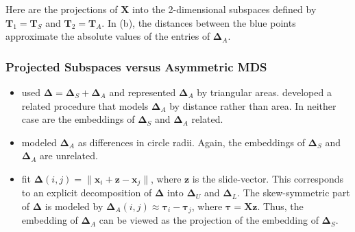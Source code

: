 \documentclass[professionalfonts,hyperref={pdfpagelabels=false,colorlinks=true,linkcolor=cyan}]{beamer}
\begin{document}
\begin{frame}
  \label{morsecode:fig}
  Here are the projections of $\mathbf{X}$ into the 2-dimensional
  subspaces defined by $\mathbf{T}_1 = \mathbf{T}_S$ and $\mathbf{T}_2
  = \mathbf{T}_A$. In (b), the distances between the blue points
  approximate the absolute values of the entries of $\bm{\Delta}_A$. 
\begin{figure}[htbp]
  \centering
  \label{fig:morsecode}
\end{figure}
\end{frame}


\begin{frame}
  \frametitle{Projected Subspaces versus Asymmetric MDS}
  \begin{itemize}
  \item \cite{gower77:_recen} used $\bm{\Delta} = \bm{\Delta}_S +
    \bm{\Delta}_A$ and represented $\bm{\Delta}_A$ by triangular
    areas. \cite{borg05:_moder} developed a related procedure that
    models $\bm{\Delta}_A$ by distance rather than area. In neither
    case are the embeddings of $\bm{\Delta}_S$ and $\bm{\Delta}_A$
    related. \vskip10pt
  \item \cite{okada87:_geomet} modeled $\bm{\Delta}_A$ as differences
    in circle radii. Again, the embeddings of $\bm{\Delta}_S$ and
    $\bm{\Delta}_A$ are unrelated. \vskip10pt 
  \item \cite{zielmand93:_analy} fit $\bm{\Delta}(i,j) =
    \|\mathbf{x}_i + \mathbf{z} - \mathbf{x}_j\|$, where $\mathbf{z}$
    is the slide-vector. This corresponds to an explicit decomposition
    of $\bm{\Delta}$ into $\bm{\Delta}_U$ and $\bm{\Delta}_L$. The
    skew-symmetric part of $\bm{\Delta}$ is modeled by
    $\bm{\Delta}_A(i,j) \approx \bm{\tau}_i - \bm{\tau}_j$,
    where $\bm{\tau} = \mathbf{X}\mathbf{z}$. Thus, the embedding
    of $\bm{\Delta}_A$ can be viewed as the projection of the
    embedding of $\bm{\Delta}_S$. 
  \end{itemize}
\end{frame}
\end{document}
